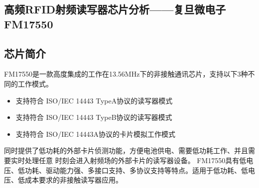 \documentclass[a4paper]{ctexart}
\begin{document}
\begin{spacing}{1.5}
\section{高频RFID射频读写器芯片分析——复旦微电子FM17550}
\subsection{芯片简介}
FM17550是一款高度集成的工作在13.56MHz下的非接触通讯芯片，支持以下3种不同的工作模式。
\begin{itemize}
	\item 支持符合 ISO/IEC 14443 TypeA协议的读写器模式
	\item 支持符合 ISO/IEC 14443 TypeB协议的读写器模式
	\item 支持符合 ISO/IEC 14443A协议的卡片模拟工作模式
\end{itemize}
同时提供了低功耗的外部卡片侦测功能，方便电池供电、需要低功耗工作、并且需要实时处理任意 时刻会进入射频场的外部卡片的读写器设备。 FM17550具有低电压、低功耗、驱动能力强、多接口支持、多协议支持等特点。适用于低功耗、低电压、低成本要求的非接触读写器应用。


\end{spacing}
\end{document}
